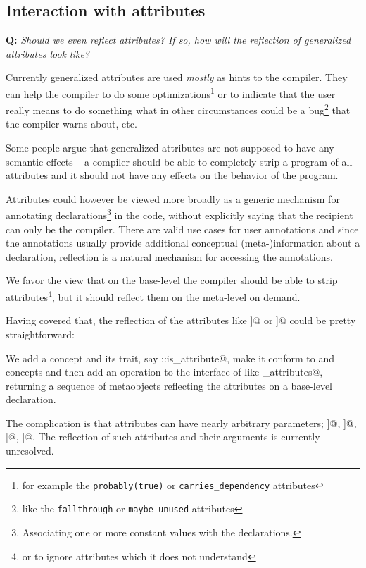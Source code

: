 \subsection{Interaction with attributes}

\textbf{Q:} {\em Should we even reflect attributes? If so, how will the reflection
of generalized attributes look like?}

Currently generalized attributes are used {\em mostly} as hints to the compiler.
They can help the compiler to do some optimizations\footnote{for example the
\texttt{probably(true)} or \texttt{carries\_dependency} attributes} or to
indicate that the user really means to do something what in other circumstances
could be a bug\footnote{like the \texttt{fallthrough} or \texttt{maybe\_unused}
attributes} that the compiler warns about, etc.

Some people argue that generalized attributes are not supposed to have any
semantic effects -- a compiler should be able to completely strip 
a program of all attributes and it should not have any effects on the behavior
of the program.

Attributes could however be viewed more broadly as a generic mechanism for
annotating declarations\footnote{Associating one or more constant values with
the declarations.} in the code, without explicitly saying that the recipient
can only be the compiler.
There are valid use cases for user annotations and since the annotations
usually provide additional conceptual (meta-)information about a declaration,
reflection is a natural mechanism for accessing the annotations.

We favor the view that on the base-level the compiler should be able to
strip attributes\footnote{or to ignore attributes which it does not understand},
but it should reflect them on the meta-level on demand.

Having covered that, the reflection of the  attributes like
\verb@[[attr1]]@ or \verb@[[namespace::attr2]]@ could be pretty straightforward:

We add a  concept and its trait, say \verb@meta::is_attribute@,
make it conform to  and  concepts and then add an
operation to the interface of  like \verb@get_attributes@, returning
a sequence of metaobjects reflecting the attributes on a base-level declaration.

The complication is that attributes can have nearly arbitrary parameters;
\verb@[[probably(true)]]@, \verb@[[deprecated("reason")]]@,
\verb@[[visibility(hidden)]]@, \verb@[[gnu::aligned(64)]]@. The reflection of
such attributes and their arguments is currently unresolved.

